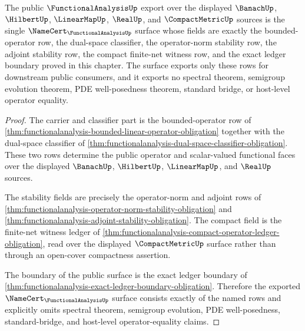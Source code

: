 \begin{theorem}
\label{thm:functionalanalysis-public-export-certificate}
The public $\FunctionalAnalysisUp$ export over the displayed $\BanachUp$,
$\HilbertUp$, $\LinearMapUp$, $\RealUp$, and $\CompactMetricUp$ sources is the
single $\NameCert_{\FunctionalAnalysisUp}$ surface whose fields are exactly
the bounded-operator row, the dual-space classifier, the operator-norm
stability row, the adjoint stability row, the compact finite-net witness row,
and the exact ledger boundary proved in this chapter. The surface exports
only these rows for downstream public consumers, and it exports no spectral
theorem, semigroup evolution theorem, PDE well-posedness theorem, standard
bridge, or host-level operator equality.
\end{theorem}
\begin{proof}
The carrier and classifier part is the bounded-operator row of
\autoref{thm:functionalanalysis-bounded-linear-operator-obligation} together
with the dual-space classifier of
\autoref{thm:functionalanalysis-dual-space-classifier-obligation}. These two
rows determine the public operator and scalar-valued functional faces over the
displayed $\BanachUp$, $\HilbertUp$, $\LinearMapUp$, and $\RealUp$ sources.

The stability fields are precisely the operator-norm and adjoint rows of
\autoref{thm:functionalanalysis-operator-norm-stability-obligation} and
\autoref{thm:functionalanalysis-adjoint-stability-obligation}. The compact
field is the finite-net witness ledger of
\autoref{thm:functionalanalysis-compact-operator-ledger-obligation}, read over
the displayed $\CompactMetricUp$ surface rather than through an open-cover
compactness assertion.

The boundary of the public surface is the exact ledger boundary of
\autoref{thm:functionalanalysis-exact-ledger-boundary-obligation}. Therefore
the exported $\NameCert_{\FunctionalAnalysisUp}$ surface consists exactly of
the named rows and explicitly omits spectral theorem, semigroup evolution,
PDE well-posedness, standard-bridge, and host-level operator-equality claims.
\end{proof}

